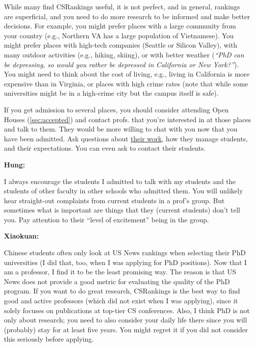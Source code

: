 \documentclass[oneside,11pt,dvipsnames]{book}
\newenvironment{commentbox}[1][]{
  \small
  \begin{mybox}
    {\small \textbf{#1}}
  }{
  \end{mybox}
}
\begin{document}
While many find CSRankings useful, it is not perfect, and in general, rankings are superficial, and you need to do more research to be informed and make better decisions. For example, you might prefer places with a large community from your country (e.g., Northern VA has a large population of Vietnamese). You might prefer places with high-tech companies (Seattle or Silicon Valley), with many outdoor activities (e.g., hiking, skiing), or with better weather (\emph{``PhD can be depressing, so would you rather be depressed in California or New York?''}).  You might need to think about the cost of living, e.g., living in California is more expensive than in Virginia, or places with high crime rates (note that while some universities might be in a high-crime city but the campus itself is safe).

If you get admission to several places, you should consider attending Open Houses (\autoref{sec:accepted}) and contact profs. that you're interested in at those places and talk to them.  They would be more willing to chat with you now that you have been admitted.  Ask questions about \href{https://github.com/dynaroars/dynaroars.github.io/wiki/Answers-to-Ph.D-Advisor-Guide}{their work}, how they manage students, and their expectations. You can even ask to contact their students.

\begin{commentbox}[Hung:]
  I always encourage the students I admitted to talk with my students and the students of other faculty in other schools who admitted them. You will unlikely hear straight-out complaints from current students in a prof’s group. But sometimes what is important are things that they (current students) don’t tell you. Pay attention to their ``level of excitement'' being in the group.
\end{commentbox}

\begin{commentbox}[Xiaokuan:]
  Chinese students often only look at US News rankings when selecting their PhD universities (I did that, too, when I was applying for PhD positions).
  Now that I am a professor, I find it to be the least promising way.
  The reason is that US News does not provide a good metric for evaluating the quality of the PhD program.
  If you want to do great research, CSRankings is the best way to find good and active professors (which did not exist when I was applying),
  since it solely focuses on publications at top-tier CS conferences.
  Also,
  I think PhD is not only about research;
  you need to also consider your daily life there since you will (probably) stay for at least five years.
  You might regret it if you did not consider this seriously before applying.
\end{commentbox}
\end{document}
